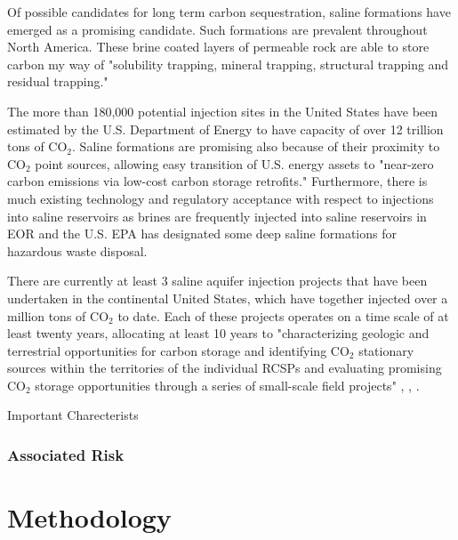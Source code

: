 \documentclass[a4paper, 12pt]{article}
\begin{document}
\par Of possible candidates for long term carbon sequestration, saline formations have emerged as a promising candidate. Such formations are prevalent throughout North America. These brine coated layers of permeable rock are able to store carbon my way of "solubility trapping, mineral trapping, structural trapping and residual trapping."

The more than 180,000 potential injection sites in the United States have been estimated by the U.S. Department of Energy to have capacity of over 12 trillion tons of CO$_2$. Saline formations are promising also because of their proximity to CO$_2$ point sources, allowing easy transition of U.S. energy assets to "near-zero carbon emissions via low-cost carbon storage retrofits." \cite{whysaline} Furthermore, there is much existing technology and regulatory acceptance with respect to injections into saline reservoirs as brines are frequently injected into saline reservoirs in EOR and the U.S. EPA has designated some deep saline formations for hazardous waste disposal.

\par There are currently at least 3 saline aquifer injection projects that have been undertaken in the continental United States, which have together injected over a million tons of CO$_2$ to date. Each of these projects operates on a time scale of at least twenty years, allocating at least 10 years to "characterizing geologic and terrestrial opportunities for carbon storage and identifying CO$_2$ stationary sources within the territories of the individual RCSPs and evaluating promising CO$_2$ storage opportunities through a series of small-scale field projects"  \cite{midwestinject}, \cite{midwestinject2}, \cite{southeastinject}. 

Important Charecterists 



\subsubsection{Associated Risk} 


\section{Methodology}
\end{document}
